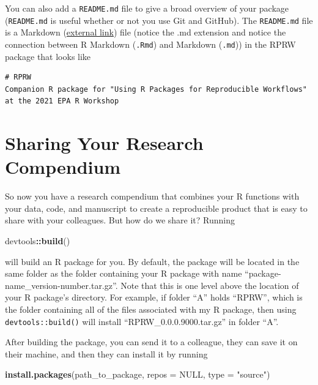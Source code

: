 \documentclass[
]{book}
\newenvironment{Shaded}{\begin{snugshade}}{\end{snugshade}}
\newcommand{\DataTypeTok}[1]{\textcolor[rgb]{0.13,0.29,0.53}{#1}}
\newcommand{\KeywordTok}[1]{\textcolor[rgb]{0.13,0.29,0.53}{\textbf{#1}}}
\newcommand{\NormalTok}[1]{#1}
\newcommand{\OperatorTok}[1]{\textcolor[rgb]{0.81,0.36,0.00}{\textbf{#1}}}
\newcommand{\OtherTok}[1]{\textcolor[rgb]{0.56,0.35,0.01}{#1}}
\newcommand{\StringTok}[1]{\textcolor[rgb]{0.31,0.60,0.02}{#1}}
\begin{document}
You can also add a \texttt{README.md} file to give a broad overview of your package (\texttt{README.md} is useful whether or not you use Git and GitHub). The \texttt{README.md} file is a Markdown (\href{https://www.markdownguide.org/}{external link}) file (notice the .md extension and notice the connection between R Markdown (\texttt{.Rmd}) and Markdown (\texttt{.md})) in the RPRW package that looks like

\begin{verbatim}
# RPRW
Companion R package for "Using R Packages for Reproducible Workflows" at the 2021 EPA R Workshop
\end{verbatim}

\hypertarget{sharing-rc}{%
\section{Sharing Your Research Compendium}\label{sharing-rc}}

So now you have a research compendium that combines your R functions with your data, code, and manuscript to create a reproducible product that is easy to share with your colleagues. But how do we share it? Running

\begin{Shaded}
\begin{Highlighting}[]
\NormalTok{devtools}\OperatorTok{::}\KeywordTok{build}\NormalTok{()}
\end{Highlighting}
\end{Shaded}

will build an R package for you. By default, the package will be located in the same folder as the folder containing your R package with name ``package-name\_version-number.tar.gz''. Note that this is one level above the location of your R package's directory. For example, if folder ``A'' holds ``RPRW'', which is the folder containing all of the files associated with my R package, then using \texttt{devtools::build()} will install ``RPRW\_0.0.0.9000.tar.gz'' in folder ``A''.

After building the package, you can send it to a colleague, they can save it on their machine, and then they can install it by running

\begin{Shaded}
\begin{Highlighting}[]
\KeywordTok{install.packages}\NormalTok{(path_to_package, }\DataTypeTok{repos =} \OtherTok{NULL}\NormalTok{, }\DataTypeTok{type =} \StringTok{"source"}\NormalTok{)}
\end{Highlighting}
\end{Shaded}
\end{document}
